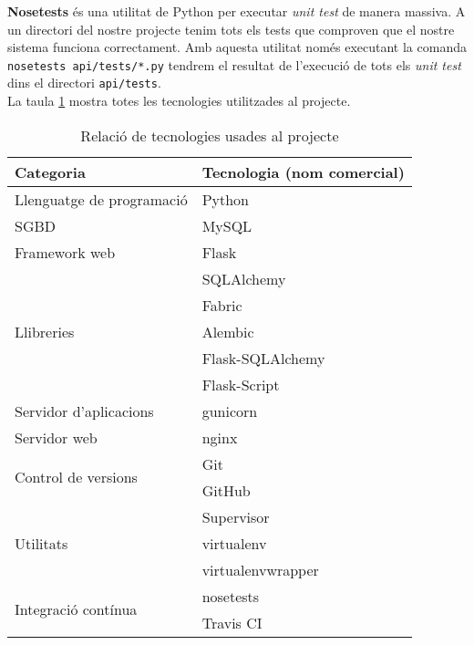 	\textbf{Nosetests} \cite{nose} és una utilitat de Python per executar \emph{unit test} de manera massiva. A un directori del nostre projecte tenim tots els tests que comproven que el nostre sistema funciona correctament. Amb aquesta utilitat només executant la comanda \texttt{nosetests api/tests/*.py} tendrem el resultat de l'execució de tots els \emph{unit test} dins el directori \texttt{api/tests}.\\
	
	La taula \ref{table:tecnologies} mostra totes les tecnologies utilitzades al projecte.

\begin{table}[h!]
 	\begin{center}
 		\begin{tabularx}{\textwidth}{|l|X|}
  			\hline
 			\bfseries Categoria & \bfseries Tecnologia (nom comercial) \\ \hline
			Llenguatge de programació &  Python \\ \hline
			\ac{SGBD} & MySQL \\ \hline
			Framework web & Flask\\ \hline
			\multirow{5}{*}{Llibreries} & SQLAlchemy  \\
 & Fabric \\
 & Alembic \\
 & Flask-SQLAlchemy \\
 & Flask-Script\\ \hline
 Servidor d'aplicacions & gunicorn \\ \hline
 Servidor web & nginx \\ \hline
\multirow{2}{*}{Control de versions} & Git \\ & GitHub \\ \hline
\multirow{3}{*}{Utilitats} & Supervisor \\ & virtualenv \\ & virtualenvwrapper\\ \hline
\multirow{2}{*}{Integració contínua} & nosetests \\ & Travis CI \\ \hline
		\end{tabularx}
	\end{center}
	\caption{Relació de tecnologies usades al projecte} 
	\label{table:tecnologies}
\end{table}
